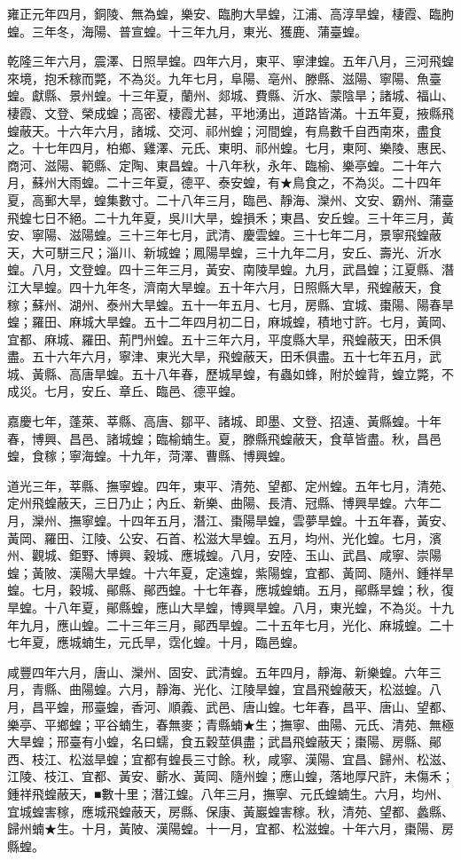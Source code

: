 \begin{pinyinscope}
雍正元年四月，銅陵、無為蝗，樂安、臨朐大旱蝗，江浦、高淳旱蝗，棲霞、臨朐蝗。三年冬，海陽、普宣蝗。十三年九月，東光、獲鹿、蒲臺蝗。

乾隆三年六月，震澤、日照旱蝗。四年六月，東平、寧津蝗。五年八月，三河飛蝗來境，抱禾稼而斃，不為災。九年七月，阜陽、亳州、滕縣、滋陽、寧陽、魚臺蝗。獻縣、景州蝗。十三年夏，蘭州、郯城、費縣、沂水、蒙陰旱；諸城、福山、棲霞、文登、榮成蝗；高密、棲霞尤甚，平地湧出，道路皆滿。十五年夏，掖縣飛蝗蔽天。十六年六月，諸城、交河、祁州蝗；河間蝗，有鳥數千自西南來，盡食之。十七年四月，柏鄉、雞澤、元氏、東明、祁州蝗。七月，東阿、樂陵、惠民、商河、滋陽、範縣、定陶、東昌蝗。十八年秋，永年、臨榆、樂亭蝗。二十年六月，蘇州大雨蝗。二十三年夏，德平、泰安蝗，有★鳥食之，不為災。二十四年夏，高郵大旱，蝗集數寸。二十八年三月，臨邑、靜海、灤州、文安、霸州、蒲臺飛蝗七日不絕。二十九年夏，吳川大旱，蝗損禾；東昌、安丘蝗。三十年三月，黃安、寧陽、滋陽蝗。三十三年七月，武清、慶雲蝗。三十七年二月，景寧飛蝗蔽天，大可駢三尺；淄川、新城蝗；鳳陽旱蝗，三十九年二月，安丘、壽光、沂水蝗。八月，文登蝗。四十三年三月，黃安、南陵旱蝗。九月，武昌蝗；江夏縣、潛江大旱蝗。四十九年冬，濟南大旱蝗。五十年六月，日照縣大旱，飛蝗蔽天，食稼；蘇州、湖州、泰州大旱蝗。五十一年五月、七月，房縣、宜城、棗陽、陽春旱蝗；羅田、麻城大旱蝗。五十二年四月初二日，麻城蝗，積地寸許。七月，黃岡、宜都、麻城、羅田、荊門州蝗。五十三年六月，平度縣大旱，飛蝗蔽天，田禾俱盡。五十六年六月，寧津、東光大旱，飛蝗蔽天，田禾俱盡。五十七年五月，武城、黃縣、高唐旱蝗。五十八年春，歷城旱蝗，有蟲如蜂，附於蝗背，蝗立斃，不成災。七月，安丘、章丘、臨邑、德平蝗。

嘉慶七年，蓬萊、莘縣、高唐、鄒平、諸城、即墨、文登、招遠、黃縣蝗。十年春，博興、昌邑、諸城蝗；臨榆蝻生。夏，滕縣飛蝗蔽天，食草皆盡。秋，昌邑蝗，食稼；寧海蝗。十九年，菏澤、曹縣、博興蝗。

道光三年，莘縣、撫寧蝗。四年，東平、清苑、望都、定州蝗。五年七月，清苑、定州飛蝗蔽天，三日乃止；內丘、新樂、曲陽、長清、冠縣、博興旱蝗。六年二月，灤州、撫寧蝗。十四年五月，潛江、棗陽旱蝗，雲夢旱蝗。十五年春，黃安、黃岡、羅田、江陵、公安、石首、松滋大旱蝗。五月，均州、光化蝗。七月，濱州、觀城、鉅野、博興、穀城、應城蝗。八月，安陸、玉山、武昌、咸寧、崇陽蝗；黃陂、漢陽大旱蝗。十六年夏，定遠蝗，紫陽蝗，宜都、黃岡、隨州、鍾祥旱蝗。七月，穀城、鄖縣、鄖西蝗。十七年春，應城蝗蝻。五月，鄖縣旱蝗；秋，復旱蝗。十八年夏，鄖縣蝗，應山大旱蝗，博興旱蝗。八月，東光蝗，不為災。十九年九月，應山蝗。二十三年三月，鄖西旱蝗。二十五年七月，光化、麻城蝗。二十七年夏，應城蝻生，元氏旱，霑化蝗。十月，臨邑蝗。

咸豐四年六月，唐山、灤州、固安、武清蝗。五年四月，靜海、新樂蝗。六年三月，青縣、曲陽蝗。六月，靜海、光化、江陵旱蝗，宜昌飛蝗蔽天，松滋蝗。八月，昌平蝗，邢臺蝗，香河、順義、武邑、唐山蝗。七年春，昌平、唐山、望都、樂亭、平鄉蝗；平谷蝻生，春無麥；青縣蝻★生；撫寧、曲陽、元氏、清苑、無極大旱蝗；邢臺有小蝗，名曰蠕，食五穀莖俱盡；武昌飛蝗蔽天；棗陽、房縣、鄖西、枝江、松滋旱蝗；宜都有蝗長三寸餘。秋，咸寧、漢陽、宜昌、歸州、松滋、江陵、枝江、宜都、黃安、蘄水、黃岡、隨州蝗；應山蝗，落地厚尺許，未傷禾；鍾祥飛蝗蔽天，■數十里；潛江蝗。八年三月，撫寧、元氏蝗蝻生。六月，均州、宜城蝗害稼，應城飛蝗蔽天，房縣、保康、黃巖蝗害稼。秋，清苑、望都、蠡縣、歸州蝻★生。十月，黃陂、漢陽蝗。十一月，宜都、松滋蝗。十年六月，棗陽、房縣蝗。


\end{pinyinscope}
